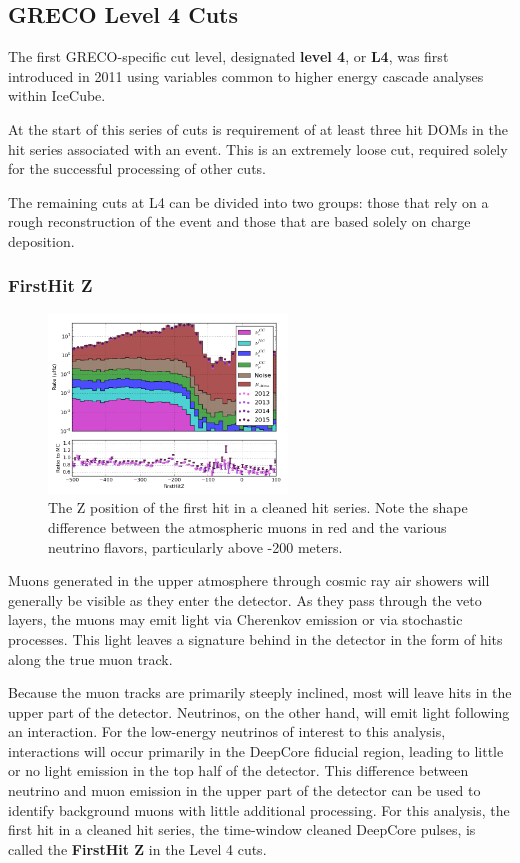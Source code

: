 \graphicspath{{chapters/greco/images/level4/}}

\subsection{GRECO Level 4 Cuts}
The first GRECO-specific cut level, designated \textbf{level 4}, or \textbf{L4}, was first introduced in 2011 using variables common to higher energy cascade analyses within IceCube. 

At the start of this series of cuts is requirement of at least three hit DOMs in the hit series associated with an event. 
This is an extremely loose cut, required solely for the successful processing of other cuts.

The remaining cuts at L4 can be divided into two groups: those that rely on a rough reconstruction of the event and those that are based solely on charge deposition.

\subsubsection{FirstHit Z}
\begin{figure}[h]
	\centering
		\includegraphics[width=2.5in]{FirstHitZ_log.png}
		\caption[The FirstHit Z position]{The Z position of the first hit in a cleaned hit series. Note the shape difference between the atmospheric muons in red and the various neutrino flavors, particularly above -200 meters.}
	\label{fig:firsthitz_log}
\end{figure}

Muons generated in the upper atmosphere through cosmic ray air showers will generally be visible as they enter the detector. 
As they pass through the veto layers, the muons may emit light via Cherenkov emission or via stochastic processes. 
This light leaves a signature behind in the detector in the form of hits along the true muon track. 

Because the muon tracks are primarily steeply inclined, most will leave hits in the upper part of the detector.
Neutrinos, on the other hand, will emit light following an interaction.
For the low-energy neutrinos of interest to this analysis, interactions will occur primarily in the DeepCore fiducial region, leading to little or no light emission in the top half of the detector. 
This difference between neutrino and muon emission in the upper part of the detector can be used to identify background muons with little additional processing.
For this analysis, the first hit in a cleaned hit series, the time-window cleaned DeepCore pulses, is called the \textbf{FirstHit Z} in the Level 4 cuts.

